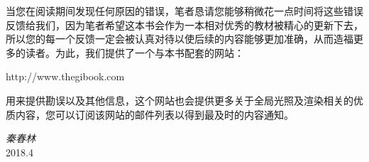 当您在阅读期间发现任何原因的错误，笔者恳请您能够稍微花一点时间将这些错误反馈给我们，因为笔者希望这本书会作为一本相对优秀的教材被精心的更新下去，所以您的每一个反馈一定会被认真对待以使后续的内容能够更加准确，从而造福更多的读者。为此，我们提供了一个与本书配套的网站：

http://www.thegibook.com

用来提供勘误以及其他信息，这个网站也会提供更多关于全局光照及渲染相关的优质内容，您可以订阅该网站的邮件列表以得到最及时的内容通知。







\vspace{\baselineskip}
\vspace{\baselineskip}
\begin{flushright}\noindent
\hfill {\it 秦春林}\\
2018.4 \hfill {\it }\\
\end{flushright}


\vspace{\baselineskip}
\vspace{\baselineskip}
\vspace{\baselineskip}


